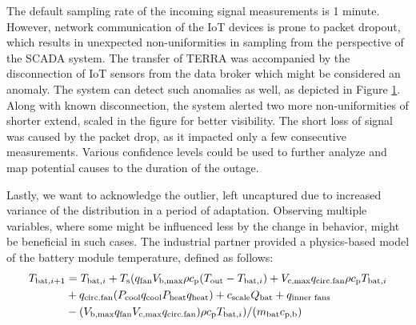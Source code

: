 The default sampling rate of the incoming signal measurements is 1 minute. However, network communication of the IoT devices is prone to packet dropout, which results in unexpected non-uniformities in sampling from the perspective of the SCADA system. The transfer of TERRA was accompanied by the disconnection of IoT sensors from the data broker which might be considered an anomaly. The system can detect such anomalies as well, as depicted in Figure \ref{fig:terra_sampling}. Along with known disconnection, the system alerted two more non-uniformities of shorter extend, scaled in the figure for better visibility. The short loss of signal was caused by the packet drop, as it impacted only a few consecutive measurements. Various confidence levels could be used to further analyze and map potential causes to the duration of the outage.

\begin{figure}[htbp]
 \centering
 \caption{}
 \label{fig:terra_sampling}
\end{figure}

Lastly, we want to acknowledge the outlier, left uncaptured due to increased variance of the distribution in a period of adaptation. Observing multiple variables, where some might be influenced less by the change in behavior, might be beneficial in such cases. The industrial partner provided a physics-based model of the battery module temperature, defined as follows:
\begin{align}
 T _{\text{bat}, i+1} &= T _{\text{bat}, i} + T _{\text{s}} (q _{\text{fan}} V _{\text{b,max}} \rho c _{\text{p}} (T _{\text{out}} - T _{\text{bat}, i}) + V _{\text{c,max}}q _{\text{circ.fan}} \rho c _{\text{p}} T _{\text{bat}, i} \nonumber \\
 &+ q _{\text{circ.fan}} (P _{\text{cool}} q _{\text{cool}} P _{\text{heat}} q _{\text{heat}}) + c _{\text{scale}} Q _{\text{bat}} + q _{\text{inner fans}} \\
 &- (V _{\text{b,max}} q _{\text{fan}} V _{\text{c,max}} q _{\text{circ.fan}}) \rho c _{\text{p}} T _{\text{bat}, i}) / (m _{\text{bat}} c _{\text{p,b}}) \text{}\nonumber
\end{align}


